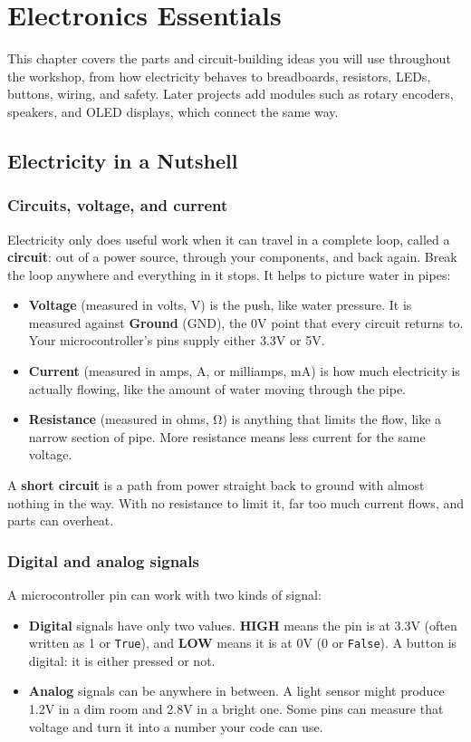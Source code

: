\chapter{Electronics Essentials} \label{electronics_essentials}

This chapter covers the parts and circuit-building ideas you will use throughout the workshop,
from how electricity behaves to breadboards, resistors, LEDs, buttons, wiring, and safety. Later
projects add modules such as rotary encoders, speakers, and OLED displays, which connect the same way.

\section{Electricity in a Nutshell}

\subsection{Circuits, voltage, and current}
Electricity only does useful work when it can travel in a complete loop, called a
\textbf{circuit}: out of a power source, through your components, and back again. Break the loop
anywhere and everything in it stops. It helps to picture water in pipes:
\begin{itemize}
    \item \textbf{Voltage} (measured in volts, V) is the push, like water pressure. It is measured
    against \textbf{Ground} (GND), the 0V point that every circuit returns to. Your microcontroller's
    pins supply either 3.3V or 5V.
    \item \textbf{Current} (measured in amps, A, or milliamps, mA) is how much electricity is
    actually flowing, like the amount of water moving through the pipe.
    \item \textbf{Resistance} (measured in ohms, \si{\ohm}) is anything that limits the flow,
    like a narrow section of pipe. More resistance means less current for the same voltage.
\end{itemize}

A \textbf{short circuit} is a path from power straight back to ground with almost nothing in the
way. With no resistance to limit it, far too much current flows, and parts can overheat.

\subsection{Digital and analog signals}
A microcontroller pin can work with two kinds of signal:
\begin{itemize}
    \item \textbf{Digital} signals have only two values. \textbf{HIGH} means the pin is at 3.3V
    (often written as 1 or \texttt{True}), and \textbf{LOW} means it is at 0V (0 or \texttt{False}).
    A button is digital: it is either pressed or not.
    \item \textbf{Analog} signals can be anywhere in between. A light sensor might produce 1.2V in
    a dim room and 2.8V in a bright one. Some pins can measure that voltage and turn it into a
    number your code can use.
\end{itemize}

